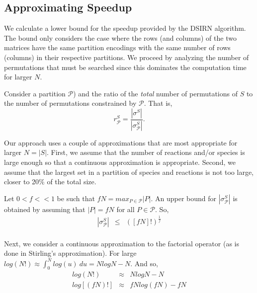 \documentclass{article}
\begin{document}
\subsection{Approximating Speedup}

We calculate a lower bound for the speedup provided by the DSIRN algorithm. The bound only considers the case where the rows (and columns) of the two matrices have the same partition encodings with the same number of rows (columns) in their respective partitions. We proceed by analyzing the number of permutations that must be searched since this dominates the computation time for larger $N$.

Consider a partition $\mathcal{P}$) and the ratio of the {\em total} number of permutations of $S$ to the number of permutations constrained by $\mathcal{P}$. That is, 
$$r_{\mathcal{P}}^S = \frac{|\sigma^S|}{|\sigma_{\mathcal{P}}^S|}.$$

Our approach uses a couple of approximations that are most appropriate for larger $N = |S|$. First, we assume that the number of reactions and/or species is large enough so that a continuous approximation is appropriate. Second, we assume that the largest set in a partition of species and reactions is not too large, closer to 20\% of the total size.

Let $0 < f << 1$ be such that $fN = max_{P \in \mathcal{P}} |P|$.
An upper bound for $|\sigma_{\mathcal{P}}^S|$
is obtained by assuming that $|P| = fN$ for all $P \in \mathcal{P}$. So, 
\begin{eqnarray}
    |\sigma_{\mathcal{P}}^S| & \leq &
    \left( \left[ fN \right] ! \right) ^{\frac{1}{f}} \\
\end{eqnarray}

Next, we consider a continuous approximation to the factorial operator (as is done in Stirling's approximation). For large $log(N!) \approx \int_0^N log (u)~ du = N log N - N$. And so,
\begin{eqnarray}
    log (N!) & \approx & N log N - N\\
    log \left[ (fN)! \right] & \approx & fN log (fN) - fN \\
\end{eqnarray}
\end{document}
